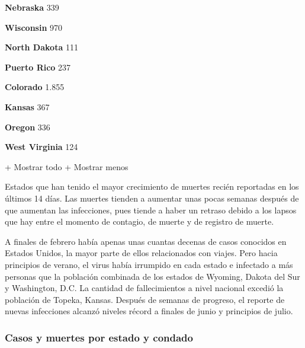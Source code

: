 \textbf{Nebraska} 339

\href{https://www.nytimes.com/interactive/2020/us/wisconsin-coronavirus-cases.html}{}

\textbf{Wisconsin} 970

\href{https://www.nytimes.com/interactive/2020/us/north-dakota-coronavirus-cases.html}{}

\textbf{North Dakota} 111

\href{https://www.nytimes.com/interactive/2020/us/puerto-rico-coronavirus-cases.html}{}

\textbf{Puerto Rico} 237

\href{https://www.nytimes.com/interactive/2020/us/colorado-coronavirus-cases.html}{}

\textbf{Colorado} 1.855

\href{https://www.nytimes.com/interactive/2020/us/kansas-coronavirus-cases.html}{}

\textbf{Kansas} 367

\href{https://www.nytimes.com/interactive/2020/us/oregon-coronavirus-cases.html}{}

\textbf{Oregon} 336

\href{https://www.nytimes.com/interactive/2020/us/west-virginia-coronavirus-cases.html}{}

\textbf{West Virginia} 124

+ Mostrar todo + Mostrar menos

Estados que han tenido el mayor crecimiento de muertes recién reportadas
en los últimos 14 días. Las muertes tienden a aumentar unas pocas
semanas después de que aumentan las infecciones, pues tiende a haber un
retraso debido a los lapsos que hay entre el momento de contagio, de
muerte y de registro de muerte.

A finales de febrero había apenas unas cuantas decenas de casos
conocidos en Estados Unidos, la mayor parte de ellos relacionados con
viajes. Pero hacia principios de verano, el virus había irrumpido en
cada estado e infectado a más personas que la población combinada de los
estados de Wyoming, Dakota del Sur y Washington, D.C. La cantidad de
fallecimientos a nivel nacional excedió la población de Topeka, Kansas.
Después de semanas de progreso, el reporte de nuevas infecciones alcanzó
niveles récord a finales de junio y principios de julio.

\hypertarget{casos-y-muertes-por-estado-y-condado}{%
\subsubsection{Casos y muertes por estado y
condado}\label{casos-y-muertes-por-estado-y-condado}}

